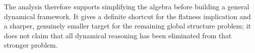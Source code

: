 \documentclass[11pt]{article}
\begin{document}
The analysis therefore supports simplifying the algebra before building
a general dynamical framework. It gives a definite shortcut for the
flatness implication and a sharper, genuinely smaller target for the
remaining global structure problem; it does not claim that all
dynamical reasoning has been eliminated from that stronger problem.
\end{document}
